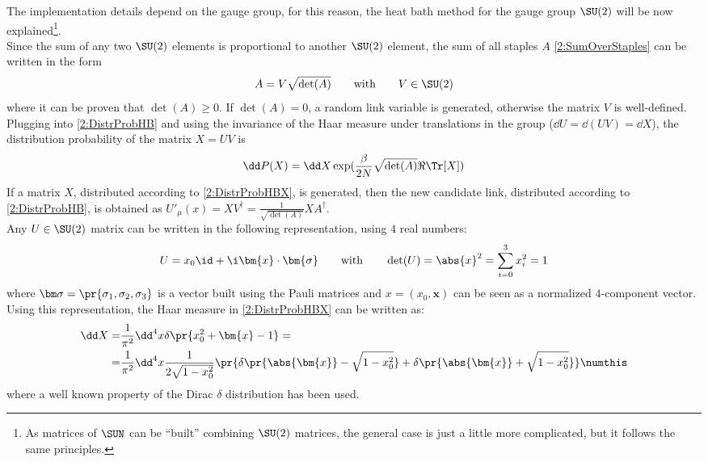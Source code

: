 The implementation details depend on the gauge group, for this reason, the heat bath method for the gauge group $\SU(2)$ will be now explained\footnote{As matrices of $\SUN$ can be ``built'' combining $\SU(2)$ matrices, the general case is just a little more complicated, but it follows the same principles.}.\\
Since the sum of any two $\SU(2)$ elements is proportional to another $\SU(2)$ element, the sum of all staples $A$ \eqref{2:SumOverStaples} can be written in the form
\begin{equation}
    A = V\sqrt{\det(A)} \qquad\text{with}\qquad V\in\SU(2) \label{2:SumOverStaplesSU2}
\end{equation}
where it can be proven that $\det(A)\geq0$.
If $\det(A)=0$, a random link variable is generated, otherwise the matrix $V$ is well-defined.
Plugging into \eqref{2:DistrProbHB} and using the invariance of the Haar measure under translations in the group ($\dd U = \dd (UV) = \dd X$), the distribution probability of the matrix $X=UV$ is
\begin{equation}
    \dd P(X) = \dd X \exp(\frac\beta{2N}\sqrt{\det(A)}\Re\Tr[X]) \label{2:DistrProbHBX}
\end{equation}
If a matrix $X$, distributed according to \eqref{2:DistrProbHBX}, is generated, then the new candidate link, distributed according to \eqref{2:DistrProbHB}, is obtained as $U'_\mu(x) = XV^\dagger = \frac1{\sqrt{\det(A)}}XA^\dagger$.\\
Any $U\in\SU(2)$ matrix can be written in the following representation, using $4$ real numbers:
\begin{equation}
    U=x_0\id+\i \bm{x} \cdot \bm{\sigma} \qquad\text{with}\qquad \det(U)=\abs{x}^2=\sum_{i=0}^3x_i^2=1 \label{2:SU2Repr}
\end{equation}
where $\bm\sigma=\pr{\sigma_1,\sigma_2,\sigma_3}$ is a vector built using the Pauli matrices and $x=(x_0,\bm{x})$ can be seen as a normalized $4$-component vector.
Using this representation, the Haar measure in \eqref{2:DistrProbHBX} can be written as:
\begin{align*}
    \dd X =& \frac1{\pi^2} \dd^4x \delta\pr{x_0^2+\bm{x}-1} =\\
    =& \frac1{\pi^2} \dd^4x \frac{1}{2\sqrt{1-x_0^2}} \pr{\delta\pr{\abs{\bm{x}}-\sqrt{1-x_0^2}}+\delta\pr{\abs{\bm{x}}+\sqrt{1-x_0^2}}} \numthis\label{2:HaarMeasureHB}
\end{align*}
where a well known property of the Dirac $\delta$ distribution has been used.\\
